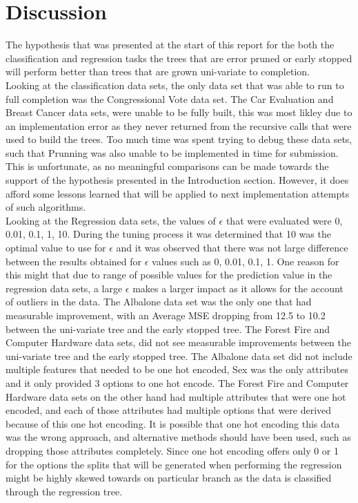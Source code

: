 \documentclass[twoside,11pt]{article}
\begin{document}
\newpage
\newpage


\section{Discussion}
\hspace*{10mm} The hypothesis that was presented at the start of this report for the both the classification and regression tasks the trees that are error pruned or early stopped will perform better than trees that are grown uni-variate to completion.\\
\hspace*{10mm} Looking at the classification data sets, the only data set that was able to run to full completion was the Congressional Vote data set. The Car Evaluation and Breast Cancer data sets, were unable to be fully built, this was most likley due to an implementation error as they never returned from the recursive calls that were used to build the trees. Too much time was spent trying to debug these data sets, such that Prunning was also unable to be implemented in time for submission. This is unfortunate, as no meaningful comparisons can be made towards the support of the hypothesis presented in the Introduction section. However, it does afford some lessons learned that will be applied to next implementation attempts of such algorithms.  \\
\hspace*{10mm} Looking at the Regression data sets, the values of $\epsilon$ that were evaluated were 0, 0.01, 0.1, 1, 10. During the tuning process it was determined that 10 was the optimal value to use for $\epsilon$ and it was observed that there was not large difference between the results obtained for $\epsilon$ values such as 0, 0.01, 0.1, 1. One reason for this might that due to range of possible values for the prediction value in the regression data sets, a large $\epsilon$ makes a larger impact as it allows for the account of outliers in the data. The Albalone data set was the only one that had measurable improvement, with an Average MSE dropping from 12.5 to 10.2 between the uni-variate tree and the early stopped tree. The Forest Fire and Computer Hardware data sets, did not see measurable improvements between the uni-variate tree and the early stopped tree. The Albalone data set did not include multiple features that needed to be one hot encoded, Sex was the only attributes and it only provided 3 options to one hot encode. The Forest Fire and Computer Hardware data sets on the other hand had multiple attributes that were one hot encoded, and each of those attributes had multiple options that were derived because of this one hot encoding. It is possible that one hot encoding this data was the wrong approach, and alternative methods should have been used, such as dropping those attributes completely. Since one hot encoding offers only 0 or 1 for the options the splits that will be generated when performing the regression might be highly skewed towards on particular branch as the data is classified through the regression tree.\\
\end{document}
